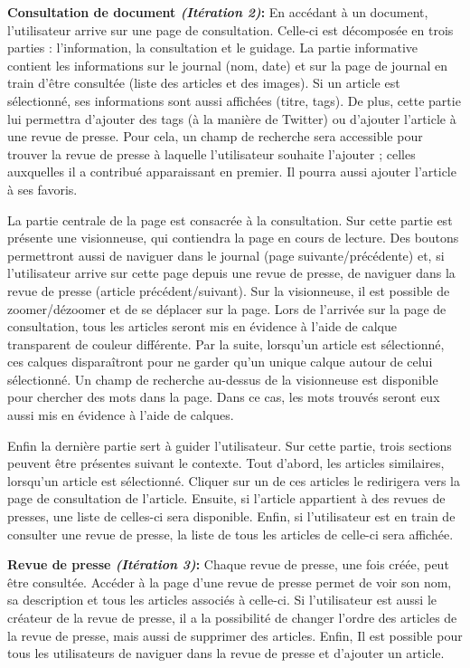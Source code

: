 	\textbf{Consultation de document \textit{(Itération 2)}:} En accédant à  un document, l'utilisateur arrive sur une page de consultation. Celle-ci est décomposée en trois parties : l'information, la consultation et le guidage. La partie informative contient les informations sur le journal (nom, date) et sur la page de journal en train d'être consultée (liste des articles et des images). Si un article est sélectionné, ses informations sont aussi affichées (titre, tags). De plus, cette partie lui permettra d'ajouter des tags (à la manière de Twitter) ou d'ajouter l'article à une revue de presse. Pour cela, un champ de recherche sera accessible pour trouver la revue de presse à laquelle l'utilisateur souhaite l'ajouter ; celles auxquelles il a contribué apparaissant en premier. Il pourra aussi ajouter l'article à ses favoris. 

	La partie centrale de la page est consacrée à la consultation. Sur cette partie est présente une visionneuse, qui contiendra la page en cours de lecture. Des boutons permettront aussi de naviguer dans le journal (page suivante/précédente) et, si l'utilisateur arrive sur cette page depuis une revue de presse, de naviguer dans la revue de presse (article précédent/suivant). Sur la visionneuse, il est possible de zoomer/dézoomer et de se déplacer sur la page. Lors de l'arrivée sur la page de consultation, tous les articles seront mis en évidence à  l'aide de calque transparent de couleur différente. Par la suite, lorsqu'un article est sélectionné, ces calques disparaîtront pour ne garder qu'un unique calque autour de celui sélectionné. Un champ de recherche au-dessus de la visionneuse est disponible pour chercher des mots dans la page. Dans ce cas, les mots trouvés seront eux aussi mis en évidence à l'aide de calques. 
	
	Enfin la dernière partie sert à guider l'utilisateur. Sur cette partie, trois sections peuvent être présentes suivant le contexte. Tout d'abord, les articles similaires, lorsqu'un article est sélectionné. Cliquer sur un de ces articles le redirigera vers la page de consultation de l'article. Ensuite, si l'article appartient à des revues de presses, une liste de celles-ci sera disponible. Enfin, si l'utilisateur est en train de consulter une revue de presse, la liste de tous les articles de celle-ci sera affichée.


	\textbf{Revue de presse \textit{(Itération 3)}:} Chaque revue de presse, une fois créée, peut être consultée. Accéder à la page d'une revue de presse permet de voir son nom, sa description et tous les articles associés à celle-ci. Si l'utilisateur est aussi le créateur de la revue de presse, il a la possibilité de changer l'ordre des articles de la revue de presse, mais aussi de supprimer des articles. Enfin, Il est possible pour tous les utilisateurs de naviguer dans la revue de presse et d'ajouter un article.

